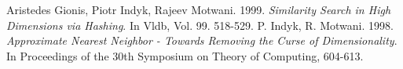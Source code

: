 \documentclass[12pt, a4paper]{article}
\theoremstyle{definition}
\begin{document}
\begin{thebibliography}{9}
  Aristedes Gionis, Piotr Indyk, Rajeev Motwani. 1999. \textit{Similarity Search in High Dimensions via Hashing}. In Vldb, Vol. 99. 518-529.
  P. Indyk, R. Motwani. 1998. \textit{Approximate Nearest Neighbor - Towards Removing the Curse of Dimensionality}. In Proceedings of the 30th Symposium on Theory of Computing, 604-613.
\end{thebibliography}
\end{document}
